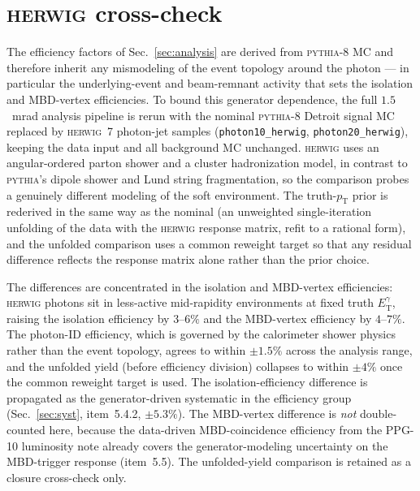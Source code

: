 \documentclass[11pt]{article}
\newcommand{\ETg}{E_{\mathrm{T}}^{\gamma}}
\newcommand{\pt}{p_{\mathrm{T}}}
\begin{document}
\section{\textsc{herwig} cross-check}
\label{app:herwig}
The efficiency factors of Sec.~\ref{sec:analysis} are derived from
\textsc{pythia-8} MC and therefore inherit any mismodeling of the event topology
around the photon --- in particular the underlying-event and beam-remnant activity
that sets the isolation and MBD-vertex efficiencies. To bound this generator
dependence, the full $1.5$~mrad analysis pipeline is rerun with the nominal
\textsc{pythia-8} Detroit signal MC replaced by \textsc{herwig}~7 photon-jet
samples (\texttt{photon10\_herwig}, \texttt{photon20\_herwig}), keeping the data
input and all background MC unchanged. \textsc{herwig} uses an angular-ordered
parton shower and a cluster hadronization model, in contrast to \textsc{pythia}'s
dipole shower and Lund string fragmentation, so the comparison probes a genuinely
different modeling of the soft environment. The truth-$\pt$ prior is rederived in
the same way as the nominal (an unweighted single-iteration unfolding of the data
with the \textsc{herwig} response matrix, refit to a rational form), and the
unfolded comparison uses a common reweight target so that any residual difference
reflects the response matrix alone rather than the prior choice.

The differences are concentrated in the isolation and MBD-vertex efficiencies:
\textsc{herwig} photons sit in less-active mid-rapidity environments at fixed
truth $\ETg$, raising the isolation efficiency by $3$--$6\%$ and the MBD-vertex
efficiency by $4$--$7\%$. The photon-ID efficiency, which is governed by the
calorimeter shower physics rather than the event topology, agrees to within
$\pm1.5\%$ across the analysis range, and the unfolded yield (before efficiency
division) collapses to within $\pm4\%$ once the common reweight target is used. The
isolation-efficiency difference is propagated as the generator-driven systematic in
the efficiency group (Sec.~\ref{sec:syst}, item~5.4.2, $\pm5.3\%$). The
MBD-vertex difference is \emph{not} double-counted here, because the data-driven
MBD-coincidence efficiency from the PPG-10 luminosity note already covers the
generator-modeling uncertainty on the MBD-trigger response (item~5.5). The
unfolded-yield comparison is retained as a closure cross-check only.
\end{document}
